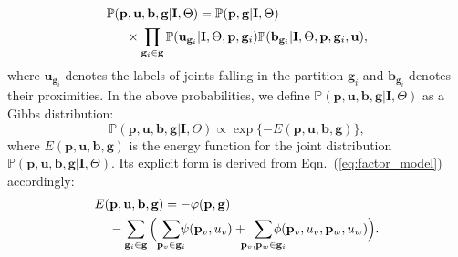 \documentclass[10pt,twocolumn,letterpaper]{article}
\begin{document}
\begin{equation}\label{eq:factor_model}
\begin{aligned}
\mathbb{P}(\mathbf{p}, \mathbf{u}, \mathbf{b}, \mathbf{g} | \mathbf{I}, \Theta) & = \mathbb{P}(\mathbf{p}, \mathbf{g}|\mathbf{I}, \Theta)  \\
& \hspace{-20mm} \times \prod_{\mathbf{g}_i \in \mathbf{g}}  \mathbb{P}(\mathbf{u}_{\mathbf{g}_i}|\mathbf{I}, \Theta, \mathbf{p}, \mathbf{g}_i) \mathbb{P}(\mathbf{b}_{\mathbf{g}_i}|\mathbf{I}, \Theta, \mathbf{p}, \mathbf{g}_i, \mathbf{u}),
\end{aligned}
\end{equation}
where $\mathbf{u}_{\mathbf{g}_i}$ denotes the labels of joints falling in the partition $\mathbf{g}_i$ and $\mathbf{b}_{\mathbf{g}_i}$ denotes their  proximities. In the above probabilities, we define $\mathbb{P}(\mathbf{p}, \mathbf{u}, \mathbf{b}, \mathbf{g} | \mathbf{I}, \Theta)$ as a Gibbs distribution:
\begin{equation}\label{eq:gibbs_distribution}
\mathbb{P}(\mathbf{p}, \mathbf{u}, \mathbf{b}, \mathbf{g} | \mathbf{I}, \Theta) \propto \exp\{-E(\mathbf{p}, \mathbf{u}, \mathbf{b}, \mathbf{g})\},
\end{equation}
where $E(\mathbf{p}, \mathbf{u}, \mathbf{b}, \mathbf{g})$ is the energy function for the joint distribution $\mathbb{P}(\mathbf{p}, \mathbf{u}, \mathbf{b}, \mathbf{g} | \mathbf{I}, \Theta)$. Its explicit form is derived from Eqn.~(\ref{eq:factor_model}) accordingly:
\begin{equation}\label{eq:energy_func}
\begin{aligned}
& E(\mathbf{p}, \mathbf{u}, \mathbf{b}, \mathbf{g})  =  -  {\varphi(\mathbf{p}, \mathbf{g})} \\
& \hspace{4mm} - \sum_{\mathbf{g}_i \in \mathbf{g}}\Big( { \sum_{\mathbf{p}_v \in \mathbf{g}_i} \hspace{-2mm} \psi(\mathbf{p}_v, u_v)} + \hspace{-2mm} {\sum_{\mathbf{p}_v,\mathbf{p}_w \in \mathbf{g}_i} \hspace{-4mm} \phi(\mathbf{p}_v, u_v, \mathbf{p}_w, u_w)}\Big).
\end{aligned}
\end{equation}
\end{document}
